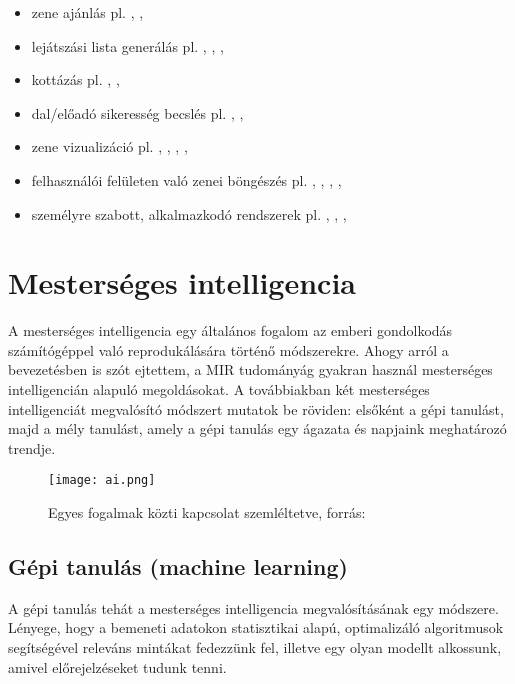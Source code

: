 \begin{itemize}
\begin{itemize}
	\item zene ajánlás pl. \cite{recommend1}, \cite{recommend2}, \cite{recommend3}
	\item lejátszási lista generálás  pl. \cite{playlist1}, \cite{playlist2}, \cite{playlist3}, \cite{playlist4}
	\item kottázás pl. \cite{score1}, \cite{score2}, \cite{score3}
	\item dal/előadó sikeresség becslés pl. \cite{popularity1}, \cite{popularity2}, \cite{popularity3}
	\item zene vizualizáció pl. \cite{visualization1}, \cite{visualization2}, \cite{visualization3}, \cite{visualization4}, \cite{visualization5}
	\item felhasználói felületen való zenei böngészés pl. \cite{ui1}, \cite{ui2}, \cite{ui3}, \cite{ui4}, \cite{ui5}
	\item személyre szabott, alkalmazkodó rendszerek pl. \cite{adaptive1}, \cite{adaptive2}, \cite{adaptive3}, \cite{adaptive4}
	\end{itemize}
\end{itemize}


\section{Mesterséges intelligencia}

A mesterséges intelligencia egy általános fogalom az emberi gondolkodás számítógéppel való reprodukálására történő módszerekre. Ahogy arról a bevezetésben is szót ejtettem, a MIR tudományág gyakran használ mesterséges intelligencián alapuló megoldásokat. A továbbiakban két mesterséges intelligenciát megvalósító módszert mutatok be röviden: elsőként a gépi tanulást, majd a mély tanulást, amely a gépi tanulás egy ágazata és napjaink meghatározó trendje. \cite{ai}

\begin{figure}[H]
  \texttt{[image: ai.png]}
  \caption{Egyes fogalmak közti kapcsolat szemléltetve, forrás: \cite{ai}}
\end{figure}

\subsection{Gépi tanulás (machine learning)}

A gépi tanulás tehát a mesterséges intelligencia megvalósításának egy módszere. Lényege, hogy a bemeneti adatokon statisztikai alapú, optimalizáló algoritmusok segítségével releváns mintákat fedezzünk fel, illetve egy olyan modellt alkossunk, amivel előrejelzéseket tudunk tenni. 

